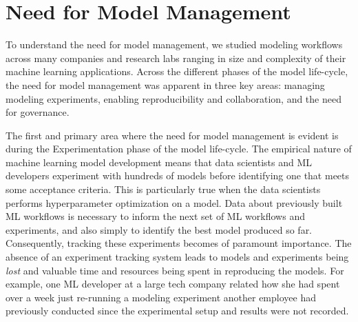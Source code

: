 \documentclass[11pt]{article}
\newcommand{\mpv}[1]{\textcolor{blue}{mpv: #1}}
\newcommand{\mlwfs}{ML workflows\xspace}
\newcommand{\mdb}{{\sc ModelDB}\xspace}
\newcommand{\dss}{data scientists\xspace}
\newcommand{\mldevs}{ML developers\xspace}
\newcommand{\mldev}{ML developer\xspace}
\begin{document}


\section{Need for Model Management}
\label{sec:motivation}

To understand the need for model management, we studied modeling workflows across
many companies and research labs ranging in size and complexity of their machine learning applications.
Across the different phases of the model life-cycle, the need for model management was apparent in three key areas: managing modeling experiments, enabling reproducibility and collaboration, and the need for governance.

The first and primary area where the need for model management is evident is during the Experimentation phase of the model life-cycle.
The empirical nature of machine learning model development means that \dss and \mldevs experiment with hundreds of models before identifying one that meets some acceptance criteria.
This is particularly true when the \dss performs hyperparameter optimization on a model.
Data about previously built \mlwfs is necessary to inform the next set of \mlwfs and experiments, and also simply to identify the best model produced so far.
Consequently, tracking these experiments becomes of paramount importance.
The absence of an experiment tracking system leads to models and experiments being {\it lost} and valuable time and resources being spent in reproducing the models.
For example, one \mldev at a large tech company related how she had spent over a week just re-running a modeling experiment another employee had previously conducted since the experimental setup and results were not recorded.
\end{document}
